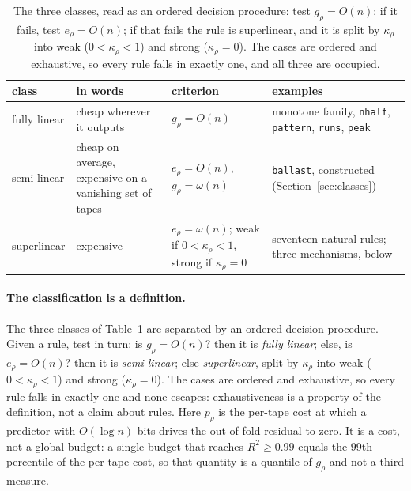 \documentclass[11pt]{article}
\theoremstyle{remark}
\begin{document}
\begin{table}[H]
\centering
\small
\begin{tabular}{@{}p{}p{}p{}p{}@{}}
\toprule
class & in words & criterion & examples \\
\midrule
fully linear & cheap wherever it outputs & $g_{\rho}=O(n)$ & monotone family, \texttt{nhalf}, \texttt{pattern}, \texttt{runs}, \texttt{peak}
\\
semi-linear & cheap on average, expensive on a vanishing set of tapes & $e_{\rho}=O(n)$, $g_{\rho}=\omega(n)$ & \texttt{ballast}, constructed (Section~\ref{sec:classes})
\\
superlinear & expensive & $e_{\rho}=\omega(n)$; weak if $0<\kappa_{\rho}<1$, strong if $\kappa_{\rho}=0$ & seventeen natural rules; three mechanisms, below
\\
\bottomrule
\end{tabular}
\caption{The three classes, read as an ordered decision procedure: test $g_{\rho}=O(n)$; if it
fails, test $e_{\rho}=O(n)$; if that fails the rule is superlinear, and it is split by
$\kappa_{\rho}$ into weak ($0<\kappa_{\rho}<1$) and strong ($\kappa_{\rho}=0$). The cases are
ordered and exhaustive, so every rule falls in exactly one, and all three are occupied.}
\label{tab:classes}
\end{table}

\paragraph{The classification is a definition.} The three classes of
Table~\ref{tab:classes} are separated by an ordered decision procedure. Given a rule, test in turn:
is $g_{\rho}=O(n)$? then it is \emph{fully linear}; else, is $e_{\rho}=O(n)$? then it is
\emph{semi-linear}; else \emph{superlinear}, split by $\kappa_{\rho}$ into weak
($0<\kappa_{\rho}<1$) and strong ($\kappa_{\rho}=0$).
The cases are ordered and exhaustive, so every rule falls in exactly one and none escapes: exhaustiveness is a
property of the definition, not a claim about rules. Here $p_{\rho}$ is the per-tape cost at which a
predictor with $O(\log n)$ bits drives the out-of-fold residual to zero. It is a cost, not a global
budget: a single budget that reaches $R^{2}\ge0.99$ equals the 99th percentile of the per-tape cost,
so that quantity is a quantile of $g_{\rho}$ and not a third measure.
\end{document}
